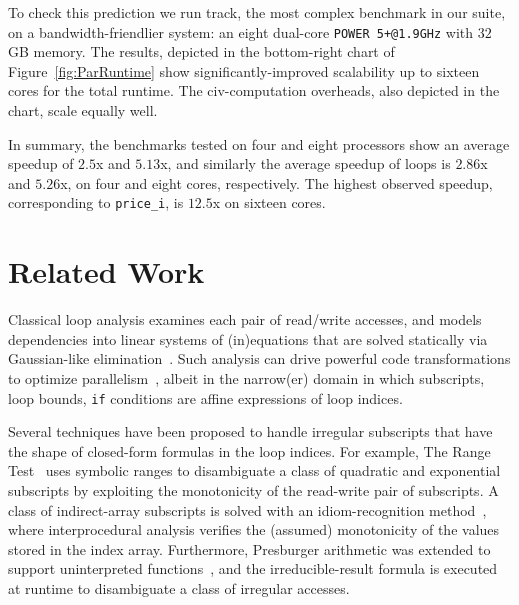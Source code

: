 \documentclass{sig-alternate}
\begin{document}
To check this prediction we run {\sc track}, the most complex benchmark in our suite, 
on a bandwidth-friendlier system: an eight dual-core {\tt POWER 5+@1.9GHz} with $32$GB memory. 
The results, depicted in the bottom-right chart of Figure~\ref{fig:ParRuntime} show 
significantly-improved scalability up to sixteen cores for the total runtime. 
The {\sc civ}-computation overheads, also depicted in the chart, scale equally well.  
 
In summary, the benchmarks tested on four and eight processors show
an average speedup of $2.5$x and $5.13$x, and similarly 
the average speedup of loops is $2.86$x and $5.26$x, on four and eight cores, 
respectively.   The highest observed speedup, corresponding to {\tt price\_i}, 
is $12.5$x on sixteen cores.


\section{Related Work}
\label{sec:RelWork}

Classical loop analysis examines each pair of read/write accesses, %
and models dependencies into linear systems of (in)equations that are solved
statically  via Gaussian-like elimination~\cite{BanerjeeIneqTest,FeautrierDataflow}. %
Such analysis  can drive powerful code transformations to optimize 
parallelism~\cite{PolyhedralOpt}, albeit in the narrow(er) domain 
in which subscripts, loop bounds, {\tt if} conditions are affine 
expressions of loop indices.

Several techniques have been proposed to handle irregular subscripts that have
the shape of closed-form formulas in the loop indices. For example, 
The Range Test~\cite{Blume94RangeTest} uses symbolic 
ranges to disambiguate a class of quadratic and  
exponential subscripts by exploiting the monotonicity of the read-write pair 
of subscripts.   A class of indirect-array subscripts is solved with 
an idiom-recognition method~\cite{PaduaDemDrInterproc}, where interprocedural 
analysis verifies the (assumed) monotonicity of the values stored in the 
index array.
%
Furthermore, Presburger arithmetic was extended to support
uninterpreted functions~\cite{Pugh98NonlinPresb}, and the irreducible-result
formula is executed at runtime to disambiguate a class of irregular
accesses. 
\end{document}
